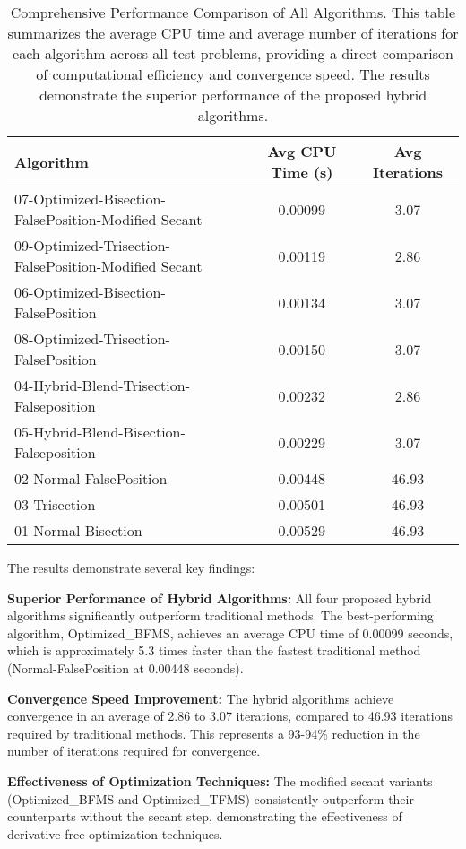 \documentclass[amsmath, amssymb, aps]{revtex4-2}
\begin{document}
\begin{table}[H]
\centering
\caption{Comprehensive Performance Comparison of All Algorithms. This table summarizes the average CPU time and average number of iterations for each algorithm across all test problems, providing a direct comparison of computational efficiency and convergence speed. The results demonstrate the superior performance of the proposed hybrid algorithms.}
\label{tab:performance_comparison}
\begin{tabular}{lcc}
\toprule
Algorithm & Avg CPU Time (s) & Avg Iterations \\
\midrule
07-Optimized-Bisection-FalsePosition-Modified Secant & 0.00099 & 3.07 \\
09-Optimized-Trisection-FalsePosition-Modified Secant & 0.00119 & 2.86 \\
06-Optimized-Bisection-FalsePosition & 0.00134 & 3.07 \\
08-Optimized-Trisection-FalsePosition & 0.00150 & 3.07 \\
04-Hybrid-Blend-Trisection-Falseposition & 0.00232 & 2.86 \\
05-Hybrid-Blend-Bisection-Falseposition & 0.00229 & 3.07 \\
02-Normal-FalsePosition & 0.00448 & 46.93 \\
03-Trisection & 0.00501 & 46.93 \\
01-Normal-Bisection & 0.00529 & 46.93 \\
\bottomrule
\end{tabular}
\end{table}

The results demonstrate several key findings:

\textbf{Superior Performance of Hybrid Algorithms:} All four proposed hybrid algorithms significantly outperform traditional methods. The best-performing algorithm, Optimized\_BFMS, achieves an average CPU time of 0.00099 seconds, which is approximately 5.3 times faster than the fastest traditional method (Normal-FalsePosition at 0.00448 seconds).

\textbf{Convergence Speed Improvement:} The hybrid algorithms achieve convergence in an average of 2.86 to 3.07 iterations, compared to 46.93 iterations required by traditional methods. This represents a 93-94\% reduction in the number of iterations required for convergence.

\textbf{Effectiveness of Optimization Techniques:} The modified secant variants (Optimized\_BFMS and Optimized\_TFMS) consistently outperform their counterparts without the secant step, demonstrating the effectiveness of derivative-free optimization techniques.
\end{document}
